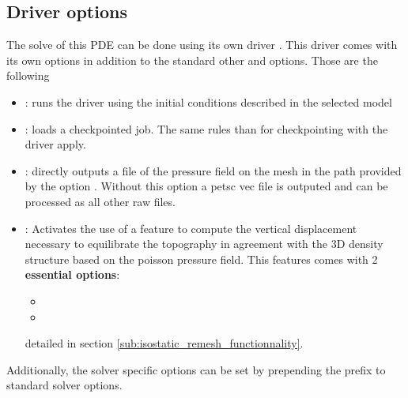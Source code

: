 \subsection{Driver options} %
\label{sub:driver_options}
The solve of this PDE can be done using its own driver .
This driver comes with its own options in addition to the standard other {\ptat} and {\PETSc} options.
Those are the following
\begin{itemize}
  \item {}: runs the driver using the initial conditions described in the selected model
  \item {}: loads a checkpointed job. The same rules than for checkpointing with the driver  apply.
  \item {}: directly outputs a  file of the pressure field on the mesh in the path provided by the option . Without this option a petsc vec  file is outputed and can be processed as all other raw files.
  \item {}: Activates the use of a feature to compute the vertical displacement necessary to equilibrate the topography in agreement with the 3D density structure based on the poisson pressure field. This features comes with 2 \textbf{essential options}:
  \begin{itemize}
     \item[\textbullet] 
     \item[\textbullet]  
   \end{itemize} 
  detailed in section \ref{sub:isostatic_remesh_functionnality}.
\end{itemize}
Additionally, the solver specific options can be set by prepending the prefix  to standard {\PETSc} solver options.

